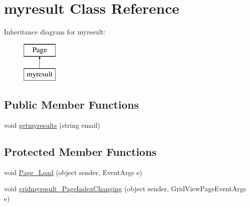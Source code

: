\hypertarget{classmyresult}{}\section{myresult Class Reference}
\label{classmyresult}
Inheritance diagram for myresult\+:\begin{figure}[H]
\begin{center}
\leavevmode
\includegraphics[height=2.000000cm]{classmyresult}
\end{center}
\end{figure}
\subsection*{Public Member Functions}
\begin{DoxyCompactItemize}
\item 
void \mbox{\hyperlink{classmyresult_a98a7b278804a36efb8058e4c2774c075}{getmyresults}} (string email)
\end{DoxyCompactItemize}
\subsection*{Protected Member Functions}
\begin{DoxyCompactItemize}
\item 
void \mbox{\hyperlink{classmyresult_ab58a038a34f73e4b5c372814f464dee1}{Page\+\_\+\+Load}} (object sender, Event\+Args e)
\item 
void \mbox{\hyperlink{classmyresult_a610ba3ac6999b8da6dd5ed8be6a8ba73}{gridmyresult\+\_\+\+Page\+Index\+Changing}} (object sender, Grid\+View\+Page\+Event\+Args e)
\end{DoxyCompactItemize}
